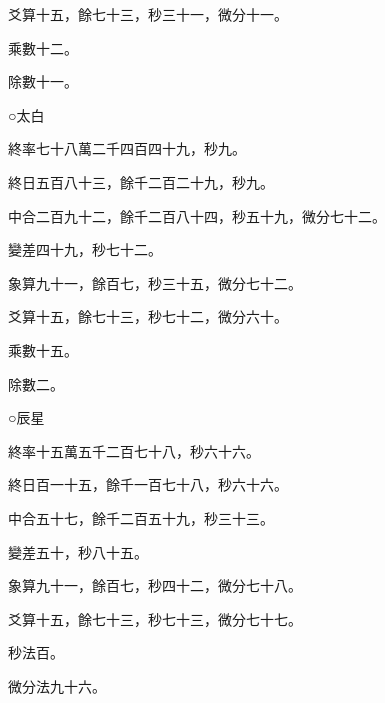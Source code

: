 \begin{pinyinscope}
 爻算十五，餘七十三，秒三十一，微分十一。



 乘數十二。



 除數十一。



 ○太白



 終率七十八萬二千四百四十九，秒九。



 終日五百八十三，餘千二百二十九，秒九。



 中合二百九十二，餘千二百八十四，秒五十九，微分七十二。



 變差四十九，秒七十二。



 象算九十一，餘百七，秒三十五，微分七十二。



 爻算十五，餘七十三，秒七十二，微分六十。



 乘數十五。



 除數二。



 ○辰星



 終率十五萬五千二百七十八，秒六十六。



 終日百一十五，餘千一百七十八，秒六十六。



 中合五十七，餘千二百五十九，秒三十三。



 變差五十，秒八十五。



 象算九十一，餘百七，秒四十二，微分七十八。



 爻算十五，餘七十三，秒七十三，微分七十七。



 秒法百。



 微分法九十六。




\end{pinyinscope}
